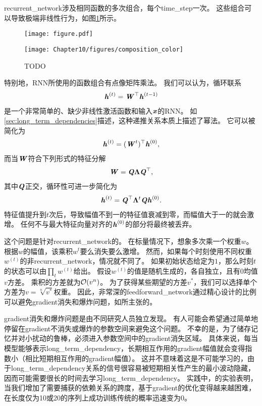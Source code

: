 
\gls{recurrent_network}涉及相同函数的多次组合，每个\gls{time_step}一次。
这些组合可以导致极端非线性行为，如图\ref{fig:chap10_composition_color}所示。
\begin{figure}[!htb]
\ifOpenSource
\centerline{\texttt{[image: figure.pdf]}}
\else
\centerline{\texttt{[image: Chapter10/figures/composition\_color]}}
\fi
\caption{TODO}
\label{fig:chap10_composition_color}
\end{figure}

特别地，\gls{RNN}所使用的函数组合有点像矩阵乘法。
我们可以认为，循环联系
\begin{align}
 \boldsymbol{\mathit{h}}^{(t)} = \boldsymbol{\mathit{W}}^\top \boldsymbol{\mathit{h}}^{(t-1)}
\end{align}
是一个非常简单的、缺少非线性激活函数和输入$\boldsymbol{\mathit{x}}$的\gls{RNN}。
如\ref{sec:long_term_dependencies}描述，这种递推关系本质上描述了幂法。
它可以被简化为
\begin{align}
 \boldsymbol{\mathit{h}}^{(t)} = (\boldsymbol{\mathit{W}}^t)^\top \boldsymbol{\mathit{h}}^{(0)},
\end{align}
而当$\boldsymbol{\mathit{W}}$符合下列形式的特征分解
\begin{align}
 \boldsymbol{\mathit{W}} = \boldsymbol{\mathit{Q}} \boldsymbol{\Lambda} \boldsymbol{\mathit{Q}}^\top,
\end{align}
其中$\boldsymbol{\mathit{Q}}$正交，循环性可进一步简化为
\begin{align}
 \boldsymbol{\mathit{h}}^{(t)} = \boldsymbol{\mathit{Q}}^\top \boldsymbol{\Lambda}^t \boldsymbol{\mathit{Q}} \boldsymbol{\mathit{h}}^{(0)}.
\end{align}
特征值提升到$t$次后，导致幅值不到一的特征值衰减到零，而幅值大于一的就会激增。
任何不与最大特征向量对齐的$\boldsymbol{\mathit{h}}^{(0)}$的部分将最终被丢弃。


这个问题是针对\gls{recurrent_network}的。
在标量情况下，想象多次乘一个权重$w$。
根据$w$的幅值，该乘积$w^t$要么消失要么激增。
然而，如果每个时刻使用不同权重$w^{(t)}$的非\gls{recurrent_network}，情况就不同了。
如果初始状态给定为$1$，那么时刻$t$的状态可以由$\prod_t w^{(t)}$给出。
假设$w^{(t)}$的值是随机生成的，各自独立，且有$0$均值$v$方差。
乘积的方差就为$\mathcal{O}(v^n)$。
为了获得某些期望的方差$v^*$，我们可以选择单个方差为$v=\sqrt[n]{v^*}$权重。
因此，非常深的\gls{feedforward_network}通过精心设计的比例可以避免\gls{gradient}消失和爆炸问题，如\cite{Sussillo14}所主张的。


\gls{gradient}消失和爆炸问题是由不同研究人员独立发现\citep{Hochreiter91-small,Bengio_icnn93,Bengio1994ITNN}。
有人可能会希望通过简单地停留在\gls{gradient}不消失或爆炸的参数空间来避免这个问题。
不幸的是，为了储存记忆并对小扰动的鲁棒，必须进入参数空间中的\gls{gradient}消失区域\citep{Bengio_icnn93,Bengio1994ITNN}。
具体来说，每当模型能够表示\gls{long_term_dependency}，长期相互作用的\gls{gradient}幅值就会变得指数小（相比短期相互作用的\gls{gradient}幅值）。
这并不意味着这是不可能学习的，由于\gls{long_term_dependency}关系的信号很容易被短期相关性产生的最小波动隐藏，因而可能需要很长的时间去学习\gls{long_term_dependency}。
实践中，\cite{Bengio1994ITNN}的实验表明，当我们增加了需要捕获的依赖关系的跨度，基于\gls{gradient}的优化变得越来越困难，在长度仅为10或20的序列上成功训练传统的概率迅速变为0。


